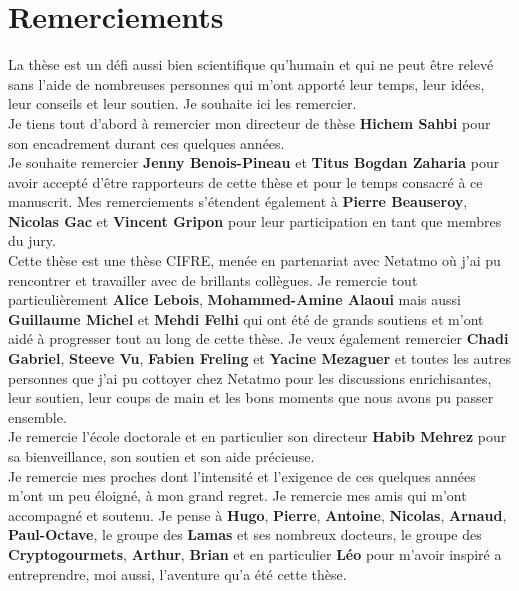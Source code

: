 \chapter*{Remerciements}

\indent La thèse est un défi aussi bien scientifique qu'humain et qui ne peut
être relevé sans l'aide de nombreuses personnes qui m'ont apporté leur temps, leur idées,
leur conseils et leur soutien. Je souhaite ici les remercier.\\

Je tiens tout d'abord à remercier mon directeur de thèse \textbf{Hichem Sahbi} pour son
encadrement durant ces quelques années.\\

Je souhaite remercier \textbf{Jenny Benois-Pineau} et \textbf{Titus Bogdan
Zaharia} pour avoir accepté d'être rapporteurs de cette thèse et pour le temps
consacré à ce manuscrit. Mes remerciements s'étendent également à \textbf{Pierre
Beauseroy}, \textbf{Nicolas Gac} et \textbf{Vincent Gripon} pour leur
participation en tant que
membres du jury.\\

Cette thèse est une thèse CIFRE, menée en partenariat avec Netatmo où j'ai pu
rencontrer et travailler avec de brillants collègues. Je remercie tout
particulièrement \textbf{Alice Lebois}, \textbf{Mohammed-Amine Alaoui} mais
aussi \textbf{Guillaume Michel} et \textbf{Mehdi Felhi} qui ont été de grands
soutiens et m'ont aidé à progresser tout au long de cette thèse. Je veux
également remercier \textbf{Chadi Gabriel}, \textbf{Steeve Vu}, \textbf{Fabien
Freling} et \textbf{Yacine Mezaguer} et toutes les autres personnes que j'ai pu
cottoyer chez Netatmo pour les discussions enrichisantes, leur soutien, leur
coups de main et les bons moments que nous avons pu passer ensemble.\\

Je remercie l'école doctorale et en particulier son directeur \textbf{Habib
Mehrez} pour sa bienveillance, son soutien et son aide précieuse.\\

Je remercie mes proches dont l'intensité et l'exigence de ces quelques années
m'ont un peu éloigné, à mon grand regret. Je remercie mes amis qui m'ont
accompagné et soutenu. Je pense à \textbf{Hugo}, \textbf{Pierre},
\textbf{Antoine}, \textbf{Nicolas}, \textbf{Arnaud}, \textbf{Paul-Octave}, le
groupe des \textbf{Lamas} et ses nombreux docteurs, le groupe des
\textbf{Cryptogourmets}, \textbf{Arthur}, \textbf{Brian} et en particulier
\textbf{Léo} pour m'avoir inspiré a entreprendre, moi aussi, l'aventure qu'a été
cette thèse.\\

